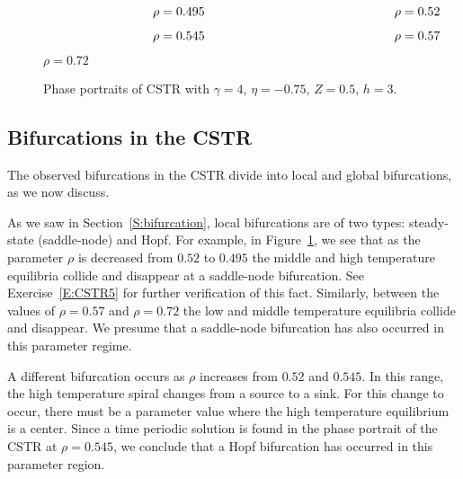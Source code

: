 \documentclass{ximera}
\begin{document}
\begin{figure}
           \centerline{%
	   }	
		\vspace*{-0.2in}	
		$\hspace{1.2in} \mbox{$\rho=0.495$ \hspace{2.0in} $\rho=0.52$}$
           \centerline{%
	   }
		\vspace*{-0.4in}
		
		$\hspace{1.2in} \mbox{$\rho=0.545$ \hspace{2.0in} $\rho=0.57$}$
		\vspace{0.4in}
	   \centerline{%
           }
 		\vspace*{-0.8in}
		
		\hspace{2.6in} $\rho=0.72$
          \caption{Phase portraits of CSTR \protect{} 
	with $\gamma=4$, $\eta=-0.75$, $Z=0.5$, $h =3$.}
           \label{F:CSTR}
\end{figure}


\subsection*{Bifurcations in the CSTR}


The observed bifurcations in the CSTR divide into local and global 
bifurcations, as we now discuss.

As we saw in Section~\ref{S:bifurcation}, local bifurcations are of two 
types: steady-state (saddle-node) and Hopf.  
  For example, in Figure~\ref{F:CSTR}, we see that as 
the parameter $\rho$ is decreased from $0.52$ to $0.495$ the middle and high 
temperature equilibria collide and disappear at a saddle-node bifurcation.  
See Exercise~\ref{E:CSTR5} for further verification of this fact.  Similarly,
between the values of $\rho=0.57$ and $\rho=0.72$ the low and middle 
temperature equilibria collide and disappear.  We presume that a  
saddle-node bifurcation has also occurred in this parameter regime.

A different bifurcation occurs as $\rho$ increases from
$0.52$ and $0.545$.  In this range, the high temperature spiral
changes from a source to a sink.  For this change to occur,
there must be a parameter value where the high temperature
equilibrium is a center.  Since a time periodic solution
is found in the phase portrait of the CSTR at $\rho=0.545$, we 
conclude that a Hopf bifurcation has occurred in this parameter region.
\end{document}
